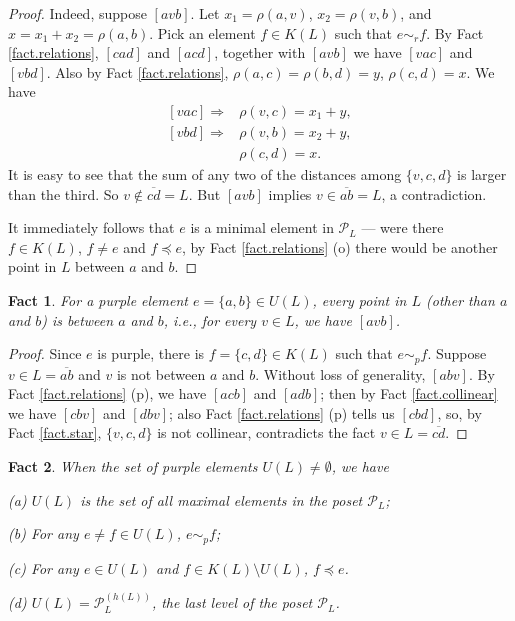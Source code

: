 \documentclass[12pt]{article}
\newcommand{\ov}{\overline}
\newtheorem{fact}{Fact}
\begin{document}
\begin{proof}
Indeed, suppose $[avb]$.
Let $x_1 = \rho(a, v)$, $x_2 = \rho(v, b)$,
and $x=x_1+x_2 = \rho(a, b)$.
Pick an element $f \in K(L)$
such that $e \sim_r f$.
By Fact \ref{fact.relations}, $[cad]$ and $[acd]$,
together with $[avb]$ we have $[vac]$ and $[vbd]$.
Also by Fact \ref{fact.relations},
$\rho(a, c) = \rho(b, d) = y$, $\rho(c, d) = x$.
We have
\[
\begin{split}
[vac] \Rightarrow & \rho(v, c) = x_1 + y, \\
[vbd] \Rightarrow & \rho(v, b) = x_2 + y, \\
& \rho(c, d) = x.
\end{split}
\]
It is easy to see that the sum of any two of the
distances among $\{v, c, d\}$ is larger than the third.
So $v \not\in \ov{cd} = L$.
But $[avb]$ implies $v \in \ov{ab} = L$, a contradiction.

It immediately follows that $e$ is a minimal element
in $\mathcal{P}_L$ --- were there $f \in K(L)$, $f \neq e$ and $f \preccurlyeq e$,
by Fact \ref{fact.relations} (o) there would be another point in $L$ between $a$ and $b$.
\end{proof}

\begin{fact}\label{fact.purple_basic}
For a purple element $e = \{a, b\} \in U(L)$,
every point in $L$ (other than $a$ and $b$) is between $a$ and $b$,
i.e., for every $v \in L$, we have $[avb]$.
\end{fact}

\begin{proof}
Since $e$ is purple, there is $f = \{c, d\} \in K(L)$
such that $e \sim_p f$.
Suppose $v \in L = \ov{ab}$ and $v$ is not between $a$ and $b$.
Without loss of generality, $[abv]$.
By Fact \ref{fact.relations} (p),
we have $[acb]$ and $[adb]$;
then by Fact \ref{fact.collinear} we have $[cbv]$ and $[dbv]$;
also Fact \ref{fact.relations} (p) tells us $[cbd]$,
so, by Fact \ref{fact.star}, $\{v, c, d\}$ is not collinear,
contradicts the fact $v \in L = \ov{cd}$.
\end{proof}

\begin{fact}\label{fact.purple_element}
When the set of purple elements $U(L) \neq \emptyset$, we have

(a) $U(L)$ is the set of all maximal elements in the poset $\mathcal{P}_L$;

(b) For any $e \neq f \in U(L)$, $e \sim_p f$;

(c) For any $e \in U(L)$ and $f \in K(L) \setminus U(L)$, $f \preccurlyeq e$.

(d) $U(L) = \mathcal{P}_L^{(h(L))}$, the last level of the poset $\mathcal{P}_L$.
\end{fact}
\end{document}
